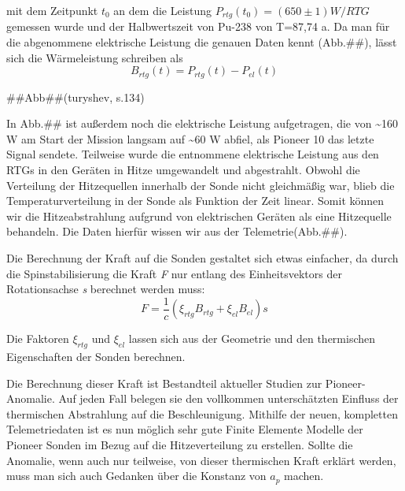 mit dem Zeitpunkt $t_0$ an dem die
Leistung  $P_{\mathit{rtg}}(t_{0})=(650\pm 1)W/\mathit{RTG}$ gemessen
wurde und der Halbwertszeit von Pu-238 von T=87,74 a. Da man f\"ur die
abgenommene elektrische Leistung die genauen Daten kennt (Abb.\#\#),
l\"asst sich die W\"armeleistung schreiben als
\begin{equation}
B_{\mathit{rtg}}(t)=P_{\mathit{rtg}}(t)-P_{\mathit{el}}(t)
\end{equation}


\bigskip

\#\#Abb\#\#(turyshev, s.134)


\bigskip

In Abb.\#\# ist au{\ss}erdem noch die elektrische Leistung aufgetragen,
die von \~{}160 W am Start der Mission langsam auf \~{}60 W abfiel, als
Pioneer 10 das letzte Signal sendete. Teilweise wurde die entnommene
elektrische Leistung aus den RTGs in den Ger\"aten in Hitze umgewandelt
und abgestrahlt. Obwohl die Verteilung der Hitzequellen innerhalb der
Sonde nicht gleichm\"a{\ss}ig war, blieb die Temperaturverteilung in
der Sonde als Funktion der Zeit linear\cite{Turyshev2010}. Somit k\"onnen
wir die Hitzeabstrahlung aufgrund von elektrischen Ger\"aten als eine
Hitzequelle behandeln. Die Daten hierf\"ur wissen wir aus der
Telemetrie(Abb.\#\#).

Die Berechnung der Kraft auf die Sonden gestaltet sich etwas einfacher,
da durch die Spinstabilisierung die Kraft \textit{F }nur entlang des
Einheitsvektors der Rotationsachse \textit{s} berechnet werden muss:
\begin{equation}
F=\frac{1}{c}(\xi _{\mathit{rtg}}B_{\mathit{rtg}}+\xi
_{\mathit{el}}B_{\mathit{el}})s
\end{equation}

Die Faktoren  $\xi _{\mathit{rtg}}$ und  $\xi _{\mathit{el}}$ lassen
sich aus der Geometrie und den thermischen Eigenschaften der Sonden
berechnen\cite{Turyshev2010}.

Die Berechnung dieser Kraft ist Bestandteil aktueller Studien zur
Pioneer-Anomalie. Auf jeden Fall belegen sie den vollkommen
untersch\"atzten Einfluss der thermischen Abstrahlung auf die
Beschleunigung. Mithilfe der neuen, kompletten Telemetriedaten ist es
nun m\"oglich sehr gute Finite Elemente Modelle der Pioneer Sonden im
Bezug auf die Hitzeverteilung zu erstellen. Sollte die Anomalie, wenn
auch nur teilweise, von dieser thermischen Kraft erkl\"art werden, muss
man sich auch Gedanken \"uber die Konstanz von  $a_{p}$ machen.


